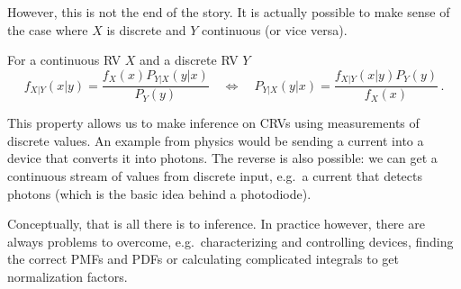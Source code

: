 However, this is not the end of the story. It is actually possible to make sense of the case where $X$ is discrete and $Y$ continuous (or vice versa).
\begin{prop}
For a continuous RV $X$ and a discrete RV $Y$
\begin{equation}
f_{X | Y}(x | y) = \frac{f_X(x) P_{Y | X}(y | x)}{P_Y(y)} \quad \Leftrightarrow \quad P_{Y | X}(y | x) = \frac{f_{X | Y}(x | y) P_Y(y)}{f_X(x)} \, .
\end{equation}
\end{prop}


This property allows us to make inference on CRVs using measurements of discrete values. An example from physics would be sending a current into a device that converts it into photons. The reverse is also possible: we can get a continuous stream of values from discrete input, e.g.~a current that detects photons (which is the basic idea behind a photodiode).

Conceptually, that is all there is to inference. In practice however, there are always problems to overcome, e.g.~characterizing and controlling devices, finding the correct PMFs and PDFs or calculating complicated integrals to get normalization factors.


